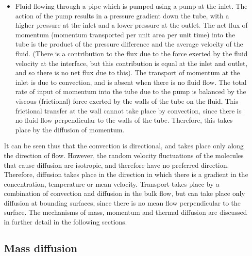 \begin{itemize}
\item Fluid flowing through a pipe which is pumped using a pump at the inlet. The action of the pump results in a pressure gradient down the tube, with a higher pressure at the inlet and a lower pressure at the outlet. The net flux of momentum (momentum transported per unit area per unit time) into the tube is the product of the pressure difference and the average velocity of the fluid. (There is a contribution to the flux due to the force exerted by the fluid velocity at the interface, but this contribution is equal at the inlet and outlet, and so there is no net flux due to this). The transport of momentum at the inlet is due to convection, and is absent when there is no fluid flow. The total rate of input of momentum into the tube due to the pump is balanced by the viscous (frictional) force exerted by the walls of the tube on the fluid. This frictional transfer at the wall cannot take place by convection, since there is no fluid flow perpendicular to the walls of the tube. Therefore, this takes place by the diffusion of momentum.
\end{itemize}

It can be seen thus that the convection is directional, and takes place only along the direction of flow. However, the random velocity fluctuations of the molecules that cause diffusion are isotropic, and therefore have no preferred direction. Therefore, diffusion takes place in the direction in which there is a gradient in the concentration, temperature or mean velocity. Transport takes place by a combination of convection and diffusion in the bulk flow, but can take place only diffusion at bounding surfaces, since there is no mean flow perpendicular to the surface. The mechanisms of mass, momentum and thermal diffusion are discussed in further detail in the following sections.


\subsection{Mass diffusion}

